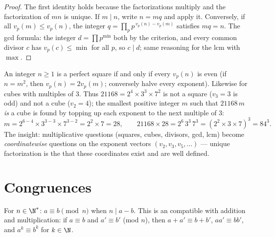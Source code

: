 \begin{proof}
The first identity holds because the factorizations multiply and the
factorization of $mn$ is unique. If $m \mid n$, write $n = mq$ and
apply it. Conversely, if all $v_p(m) \leq v_p(n)$, the integer $q =
\prod_p p^{\,v_p(n) - v_p(m)}$ satisfies $mq = n$. The gcd formula:
the integer $d = \prod p^{\min}$  both by the criterion, and
every common divisor $c$ has $v_p(c) \leq \min$ for all $p$, so $c
\mid d$; same reasoning for the lcm with $\max$.
\end{proof}

\begin{example}\label{ex:b1:arith:squarecube}
An integer $n \geq 1$ is a perfect square if and only if every
$v_p(n)$ is even (if $n = m^2$, then $v_p(n) = 2v_p(m)$;
conversely halve every exponent). Likewise for cubes with
multiples of $3$. Thus $21168 = 2^4 \times 3^3 \times 7^2$ is not
a square ($v_3 = 3$ is odd) and not a cube ($v_2 = 4$); the
smallest positive integer $m$ such that $21168\,m$ \emph{is} a
cube is found by topping up each exponent to the next multiple of
$3$:
\[
m = 2^{6-4} \times 3^{3-3} \times 7^{3-2} = 2^2 \times 7 = 28,
\qquad
21168 \times 28 = 2^6\,3^3\,7^3 = (2^2 \times 3 \times 7)^3
= 84^3 .
\]
The insight: multiplicative questions (squares, cubes, divisors,
gcd, lcm) become \emph{coordinatewise} questions on the exponent
vectors $(v_2, v_3, v_5, \dots)$ --- unique factorization is the
 that these coordinates exist and are well defined.
\end{example}

\section{Congruences}

\begin{definition}\label{def:b1:arith:congruence}
For $n \in \N^*$: $a \equiv b \pmod n$ when $n \mid
a - b$. This is an  compatible with addition and
multiplication: if $a \equiv b$ and $a' \equiv b'$ (mod $n$), then
$a + a' \equiv b + b'$, $aa' \equiv bb'$, and $a^k \equiv b^k$ for
$k \in \N$.
\end{definition}

